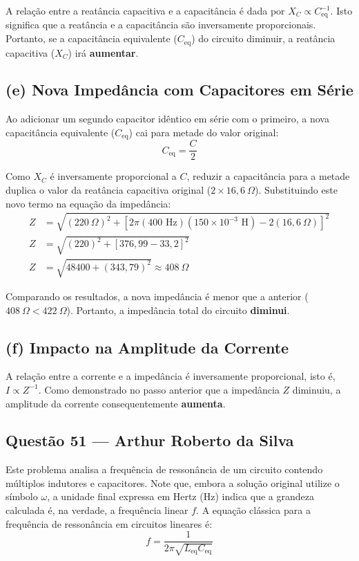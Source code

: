 \documentclass[12pt,a4paper]{article}
\begin{document}
A relação entre a reatância capacitiva e a capacitância é dada por $X_C \propto C_{\text{eq}}^{-1}$. Isto significa que a reatância e a capacitância são inversamente proporcionais. Portanto, se a capacitância equivalente ($C_{\text{eq}}$) do circuito diminuir, a reatância capacitiva ($X_C$) irá \textbf{aumentar}.

\subsection*{(e) Nova Impedância com Capacitores em Série}

Ao adicionar um segundo capacitor idêntico em série com o primeiro, a nova capacitância equivalente ($C_{\text{eq}}$) cai para metade do valor original:
\begin{equation*}
C_{\text{eq}} = \frac{C}{2}
\end{equation*}

Como $X_C$ é inversamente proporcional a $C$, reduzir a capacitância para a metade duplica o valor da reatância capacitiva original ($2 \times 16,6\ \Omega$). Substituindo este novo termo na equação da impedância:
\begin{align*}
Z &= \sqrt{(220\ \Omega)^2 + [2\pi(400\text{ Hz})(150 \times 10^{-3}\text{ H}) - 2(16,6\ \Omega)]^2} \\
Z &= \sqrt{(220)^2 + [376,99 - 33,2]^2} \\
Z &= \sqrt{48400 + (343,79)^2} \approx 408\ \Omega
\end{align*}

Comparando os resultados, a nova impedância é menor que a anterior ($408\ \Omega < 422\ \Omega$). Portanto, a impedância total do circuito \textbf{diminui}.

\subsection*{(f) Impacto na Amplitude da Corrente}

A relação entre a corrente e a impedância é inversamente proporcional, isto é, $I \propto Z^{-1}$. Como demonstrado no passo anterior que a impedância $Z$ diminuiu, a amplitude da corrente consequentemente \textbf{aumenta}.

\subsection{Questão 51 — Arthur Roberto da Silva}
Este problema analisa a frequência de ressonância de um circuito contendo múltiplos indutores e capacitores. Note que, embora a solução original utilize o símbolo $\omega$, a unidade final expressa em Hertz ($\text{Hz}$) indica que a grandeza calculada é, na verdade, a frequência linear $f$. A equação clássica para a frequência de ressonância em circuitos lineares é:
\begin{equation*}
f = \frac{1}{2\pi\sqrt{L_{\text{eq}}C_{\text{eq}}}}
\end{equation*}
\end{document}
